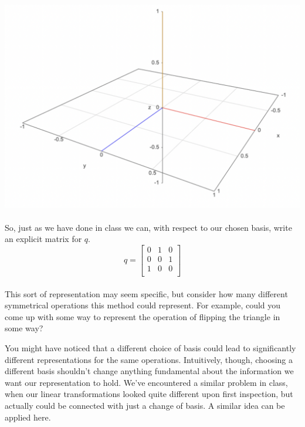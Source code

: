 \documentclass[twoside]{article}
\begin{document}
\begin{spacing}{1.25}
\begin{center}
  \includegraphics[scale=0.35]{images/second.png}  
\end{center}

\paragraph*{} So, just as we have done in class we can, with respect to our chosen basis, write an explicit matrix for $q$.
\[
q = 
\begin{bmatrix}
0 & 1 & 0 \\ 
0 & 0 & 1 \\
1 & 0 & 0 \\
\end{bmatrix}
\]

\paragraph*{}  This sort of representation may seem specific,
but consider how many different symmetrical operations this method could represent. For example, could you come up with some way to represent the operation of flipping the triangle 
in some way?

You might have noticed that a different choice of basis could lead to significantly different
representations for the same operations. Intuitively, though, choosing a different basis shouldn't
change anything fundamental about the information we want our representation to hold. We've encountered a similar problem in class, when our linear transformations
looked quite different upon first inspection, but actually could be connected with just a change of basis. A similar idea can be applied here.

\end{spacing}
\end{document}
